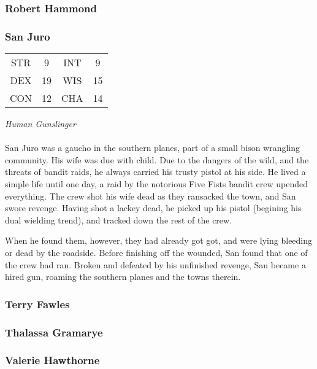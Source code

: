 \subsubsection{Robert Hammond}
\label{people:hammond}

\subsubsection{San Juro}
\label{people:david}
\begin{center}
\begin{tabular}{c c|c c}
STR & 9 & INT & 9 \\
DEX & 19 & WIS & 15 \\
CON & 12 & CHA & 14 \end{tabular}\end{center}
\textit{Human Gunslinger}\\
\\
San Juro was a gaucho in the southern planes, part of a small bison wrangling community. His wife was due with child. Due to the dangers of the wild, and the threats of bandit raids, he always carried his trusty pistol at his side. He lived a simple life until one day, a raid by the notorious Five Fists bandit crew upended everything. The crew shot his wife dead as they ransacked the town, and San swore revenge. Having shot a lackey dead, he picked up his pistol (begining his dual wielding trend), and tracked down the rest of the crew.

When he found them, however, they had already got got, and were lying bleeding or dead by the roadside. Before finishing off the wounded, San found that one of the crew had ran. Broken and defeated by his unfinished revenge, San became a hired gun, roaming the southern planes and the towns therein.


\subsubsection{Terry Fawles}
\label{people:fawles}

\subsubsection{Thalassa Gramarye}
\label{people:thalassa}

\subsubsection{Valerie Hawthorne}
\label{people:valerie}

